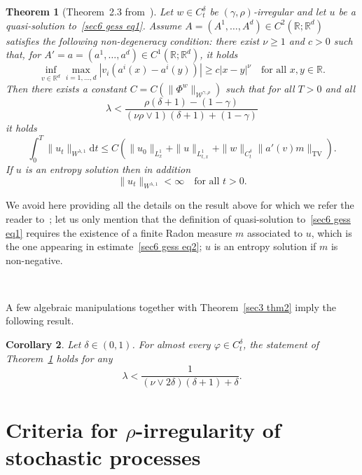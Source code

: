 \documentclass[10pt]{article}
\newcommand{\mathd}{\mathrm{d}}
\newcommand{\tmop}[1]{\ensuremath{\operatorname{#1}}}
\newtheorem{theorem}{Theorem}
\newtheorem{corollary}[theorem]{Corollary}
\begin{document}
\begin{theorem}[Theorem~2.3 from~{\cite{choukgess}}]
  \label{sec6 thm chouk gess} Let $w \in C^{\delta}_t$ be $(\gamma,
  \rho)$\mbox{-}irregular and let $u$ be a quasi\mbox{-}solution
  to~{\eqref{sec6 gess eq1}}. Assume $A = (A^1, \ldots, A^d) \in C^2
  (\mathbb{R}; \mathbb{R}^d)$ satisfies the following non\mbox{-}degeneracy
  condition: there exist $\nu \geqslant 1$ and $c > 0$ such that, for $A' = a
  = (a^1, \ldots, a^d) \in C^1 (\mathbb{R}; \mathbb{R}^d)$, it holds
  \[ \inf_{v \in \mathbb{R}^d} \max_{i = 1, \ldots, d}  | v_i (a^i (x) - a^i
     (y)) | \geqslant c | x - y |^{\nu} \quad \text{for all } x, y \in
     \mathbb{R}. \]
  Then there exists a constant $C = C (\| \Phi^w \|_{\mathcal{W}^{\gamma,
  \rho}})$ such that for all $T > 0$ and all
  \[ \lambda < \frac{\rho (\delta + 1) - (1 - \gamma)}{(\nu \rho \vee 1)
     (\delta + 1) + (1 - \gamma)} \]
  it holds
  \begin{equation}
    \int_0^T \| u_t \|_{W^{\lambda, 1}} \mathd t \leqslant C (\| u_0
    \|_{L^1_x} + \| u \|_{L^1_{t, x}} + \| w \|_{C^{\delta}_t}  \| a' (v) m
    \|_{\tmop{TV}}) . \label{sec6 gess eq2}
  \end{equation}
  If $u$ is an entropy solution then in addition
  \[ \| u_t \|_{W^{\lambda, 1}} < \infty \quad \text{for all } t > 0. \]
\end{theorem}

We avoid here providing all the details on the result above for which we refer
the reader to~{\cite{choukgess}}; let us only mention that the definition of
quasi\mbox{-}solution to~{\eqref{sec6 gess eq1}} requires the existence of a
finite Radon measure $m$ associated to $u$, which is the one appearing in
estimate~{\eqref{sec6 gess eq2}}; $u$ is an entropy solution if $m$ is
non\mbox{-}negative.

\

A few algebraic manipulations together with Theorem~\ref{sec3 thm2} imply the
following result.

\begin{corollary}
  Let $\delta \in (0, 1)$. For almost every $\varphi \in C^{\delta}_t$, the
  statement of Theorem~\ref{sec6 thm chouk gess} holds for any
  \[ \lambda < \frac{1}{(\nu \vee 2 \delta) (\delta + 1) + \delta} . \]
\end{corollary}

\section{Criteria for $\rho$-irregularity of stochastic processes}\label{sec4}
\end{document}
